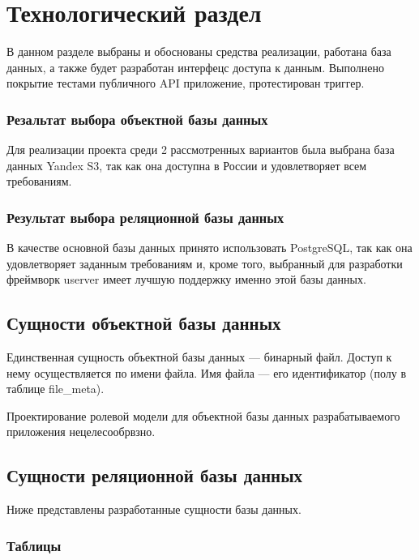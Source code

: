 \section{Технологический раздел} \label{tech}

В данном разделе выбраны и обоснованы средства реализации, работана база данных, а также будет разработан интерфецс доступа к данным. Выполнено покрытие тестами публичного API приложение, протестирован триггер.

\subsubsection{Резальтат выбора объектной базы данных}

Для реализации проекта среди 2 рассмотренных вариантов была выбрана база данных Yandex S3, так как она доступна в России и удовлетворяет всем требованиям.


\subsubsection{Результат выбора реляционной базы данных}

В качестве основной базы данных принято использовать PostgreSQL, так как она удовлетворяет заданным требованиям и, кроме того, выбранный для разработки фреймворк userver имеет лучшую поддержку именно этой базы данных.

\subsection{Сущности объектной базы данных}

Единственная сущность объектной базы данных --- бинарный файл. Доступ к нему осуществляется по имени файла. Имя файла --- его идентификатор (полу в таблице file{\_}meta).

Проектирование ролевой модели для объектной базы данных разрабатываемого приложения нецелесообрвзно.

\subsection{Сущности реляционной базы данных}

Ниже представлены разработанные сущности базы данных.

\subsubsection{Таблицы}

